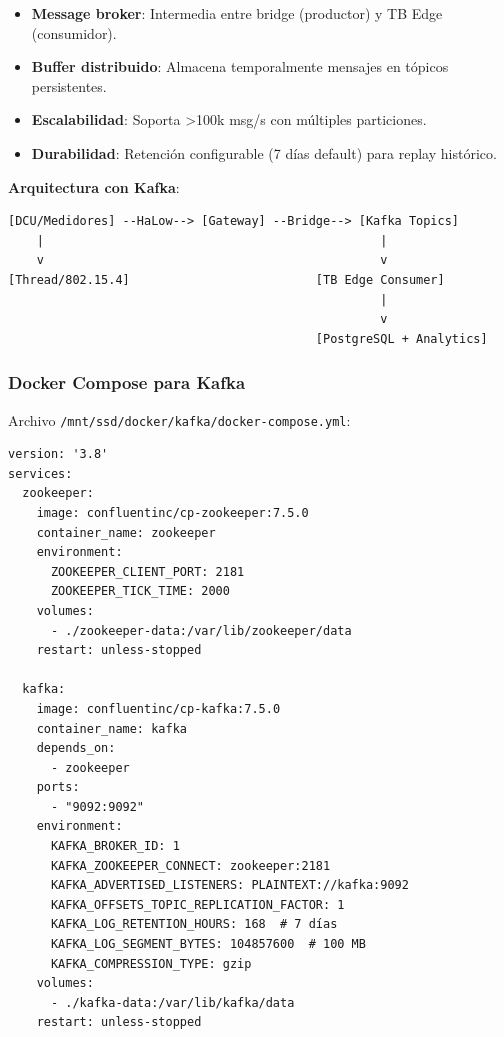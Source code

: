 \begin{itemize}
    \item \textbf{Message broker}: Intermedia entre bridge (productor) y TB Edge (consumidor).
    \item \textbf{Buffer distribuido}: Almacena temporalmente mensajes en tópicos persistentes.
    \item \textbf{Escalabilidad}: Soporta >100k msg/s con múltiples particiones.
    \item \textbf{Durabilidad}: Retención configurable (7 días default) para replay histórico.
\end{itemize}

\textbf{Arquitectura con Kafka}:
\begin{verbatim}
[DCU/Medidores] --HaLow--> [Gateway] --Bridge--> [Kafka Topics] 
    |                                               |
    v                                               v
[Thread/802.15.4]                          [TB Edge Consumer]
                                                    |
                                                    v
                                           [PostgreSQL + Analytics]
\end{verbatim}

\subsubsection{Docker Compose para Kafka}

Archivo \texttt{/mnt/ssd/docker/kafka/docker-compose.yml}:
\begin{verbatim}
version: '3.8'
services:
  zookeeper:
    image: confluentinc/cp-zookeeper:7.5.0
    container_name: zookeeper
    environment:
      ZOOKEEPER_CLIENT_PORT: 2181
      ZOOKEEPER_TICK_TIME: 2000
    volumes:
      - ./zookeeper-data:/var/lib/zookeeper/data
    restart: unless-stopped

  kafka:
    image: confluentinc/cp-kafka:7.5.0
    container_name: kafka
    depends_on:
      - zookeeper
    ports:
      - "9092:9092"
    environment:
      KAFKA_BROKER_ID: 1
      KAFKA_ZOOKEEPER_CONNECT: zookeeper:2181
      KAFKA_ADVERTISED_LISTENERS: PLAINTEXT://kafka:9092
      KAFKA_OFFSETS_TOPIC_REPLICATION_FACTOR: 1
      KAFKA_LOG_RETENTION_HOURS: 168  # 7 días
      KAFKA_LOG_SEGMENT_BYTES: 104857600  # 100 MB
      KAFKA_COMPRESSION_TYPE: gzip
    volumes:
      - ./kafka-data:/var/lib/kafka/data
    restart: unless-stopped
\end{verbatim}


